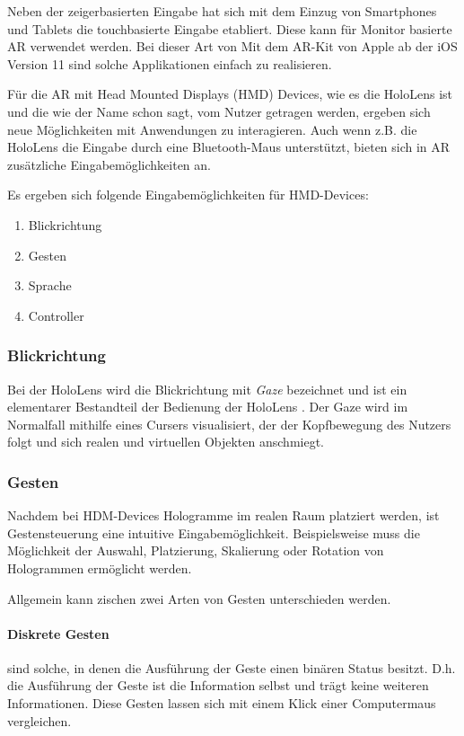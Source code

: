 Neben der zeigerbasierten Eingabe hat sich mit dem Einzug von Smartphones und Tablets die touchbasierte Eingabe etabliert. Diese kann für Monitor basierte AR verwendet werden. Bei dieser Art von Mit dem AR-Kit von Apple ab der iOS Version 11 sind solche Applikationen einfach zu realisieren.

Für die AR mit Head Mounted Displays (HMD) Devices, wie es die HoloLens ist und die wie der Name schon sagt, vom Nutzer getragen werden, ergeben sich neue Möglichkeiten mit Anwendungen zu interagieren. Auch wenn z.B. die HoloLens die Eingabe durch eine Bluetooth-Maus unterstützt, bieten sich in AR zusätzliche Eingabemöglichkeiten an.

Es ergeben sich folgende Eingabemöglichkeiten für HMD-Devices:

\begin{enumerate}
  \item Blickrichtung
  \item Gesten
  \item Sprache
  \item Controller
\end{enumerate}

\subsubsection*{Blickrichtung}
Bei der HoloLens wird die Blickrichtung mit \textit{Gaze} bezeichnet und ist ein elementarer Bestandteil der Bedienung der HoloLens \cite{windows2017interaction}. Der Gaze wird im Normalfall mithilfe eines Cursers visualisiert, der der Kopfbewegung des Nutzers folgt und sich realen und virtuellen Objekten anschmiegt.

\subsubsection*{Gesten}
Nachdem bei HDM-Devices Hologramme im realen Raum platziert werden, ist Gestensteuerung eine intuitive Eingabemöglichkeit. Beispielsweise muss die Möglichkeit der Auswahl, Platzierung, Skalierung oder Rotation von Hologrammen ermöglicht werden.

Allgemein kann zischen zwei Arten von Gesten unterschieden werden.

\paragraph{Diskrete Gesten} sind solche, in denen die Ausführung der Geste einen binären Status besitzt. D.h. die Ausführung der Geste ist die Information selbst und trägt keine weiteren Informationen. Diese Gesten lassen sich mit einem Klick einer Computermaus vergleichen.

